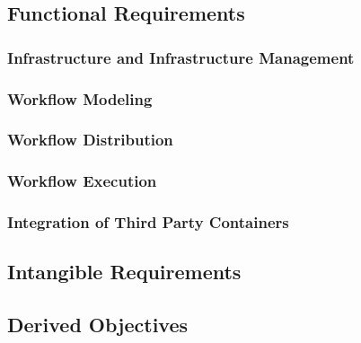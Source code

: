 
\subsection{Functional Requirements} %
  \label{sub:functional_requirements}

  \subsubsection{Infrastructure and Infrastructure Management} %
    \label{ssub:infrastructure_management}

  \subsubsection{Workflow Modeling} %
    \label{ssub:workflow_modeling}

  \subsubsection{Workflow Distribution} %
    \label{ssub:workflow_distribution}

  \subsubsection{Workflow Execution} %
    \label{ssub:workflow_execution}

  \subsubsection{Integration of Third Party Containers} %
    \label{ssub:integration_of_third_party_containers}

\subsection{Intangible Requirements} %
  \label{sub:intangible_requirements}

\subsection{Derived Objectives} %
  \label{sub:derived_objectives}
